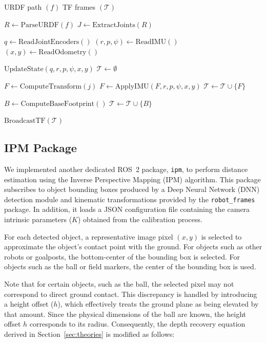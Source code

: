 \documentclass[journal]{IAENGtran}
\begin{document}
\begin{algorithm}[!h]
\caption{Robot Frames Package}
\label{alg:robot_frames}
\footnotesize
\begin{algorithmic}[1]
\Require URDF path $(f)$
\Ensure TF frames $(\mathcal{T})$

\State $R \gets \text{ParseURDF}(f)$
\State $J \gets \text{ExtractJoints}(R)$

    \State $q \gets \text{ReadJointEncoders}()$
    \State $(r,p,\psi) \gets \text{ReadIMU}()$
    \State $(x,y) \gets \text{ReadOdometry}()$

    \State $\text{UpdateState}(q, r,p,\psi, x,y)$
    \State $\mathcal{T} \gets \emptyset$

        \State $F \gets \text{ComputeTransform}(j)$
            \State $F \gets \text{ApplyIMU}(F, r,p,\psi, x,y)$
        \EndIf
        \State $\mathcal{T} \gets \mathcal{T} \cup \{F\}$
    \EndFor

    \State $B \gets \text{ComputeBaseFootprint}()$
    \State $\mathcal{T} \gets \mathcal{T} \cup \{B\}$

    \State $\text{BroadcastTF}(\mathcal{T})$
\EndWhile

\end{algorithmic}
\end{algorithm}

\subsection{IPM Package}

We implemented another dedicated ROS~2 package, \texttt{ipm}, to perform distance estimation using
the Inverse Perspective Mapping (IPM) algorithm. This package subscribes to object bounding boxes
produced by a Deep Neural Network (DNN) detection module and kinematic transformations provided by
the \texttt{robot\_frames} package. In addition, it loads a JSON configuration file containing the
camera intrinsic parameters ($K$) obtained from the calibration process.

For each detected object, a representative image pixel $(x, y)$ is selected to approximate the
object's contact point with the ground. For objects such as other robots or goalposts, the
bottom-center of the bounding box is selected. For objects such as the ball or field markers,
the center of the bounding box is used.

Note that for certain objects, such as the ball, the selected pixel may not correspond to direct
ground contact. This discrepancy is handled by introducing a height offset ($h$), which effectively
treats the ground plane as being elevated by that amount. Since the physical dimensions of the ball
are known, the height offset $h$ corresponds to its radius. Consequently, the depth recovery
equation derived in Section~\ref{sec:theories} is modified as follows:
\end{document}
